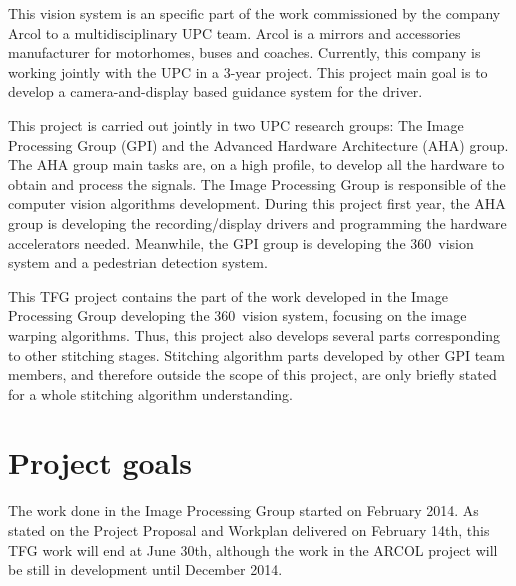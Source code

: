 This vision system is an specific part of the work commissioned by the company Arcol to a multidisciplinary UPC team. Arcol is a mirrors and accessories manufacturer for motorhomes, buses and coaches. Currently, this company is working jointly with the UPC in a 3-year project. This project main goal is to develop a camera-and-display based guidance system for the driver.

This project is carried out jointly in two UPC research groups: The Image Processing Group (GPI) and the Advanced Hardware Architecture (AHA) group. The AHA group main tasks are, on a high profile, to develop all the hardware to obtain and process the signals. The Image Processing Group is responsible of the computer vision algorithms development. During this project first year, the AHA group is developing the recording/display drivers and programming the hardware accelerators needed. Meanwhile, the GPI group is developing the 360\degree~vision system and a pedestrian detection system.

This TFG project contains the part of the work developed in the Image Processing Group developing the  360\degree~vision system, focusing on the image warping algorithms. Thus, this project also develops several parts corresponding to other stitching stages. Stitching algorithm parts developed by other GPI team members, and therefore outside the scope of this project, are only briefly stated for a whole stitching algorithm understanding.

\section{Project goals}
The work done in the Image Processing Group started on February 2014. As stated on the Project Proposal and Workplan delivered on February 14th, this TFG work will end at June 30th, although the work in the ARCOL project will be still in development until December 2014.

